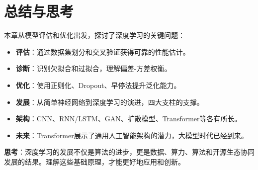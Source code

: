 \section{总结与思考}

本章从模型评估和优化出发，探讨了深度学习的关键问题：
\begin{itemize}
    \item \textbf{评估}：通过数据集划分和交叉验证获得可靠的性能估计。
    \item \textbf{诊断}：识别欠拟合和过拟合，理解偏差-方差权衡。
    \item \textbf{优化}：使用正则化、Dropout、早停法提升泛化能力。
    \item \textbf{发展}：从简单神经网络到深度学习的演进，四大支柱的支撑。
    \item \textbf{架构}：CNN、RNN/LSTM、GAN、扩散模型、Transformer等各有所长。
    \item \textbf{未来}：Transformer展示了通用人工智能架构的潜力，大模型时代已经到来。
\end{itemize}

\textbf{思考}：深度学习的发展不仅是算法的进步，更是数据、算力、算法和开源生态协同发展的结果。理解这些基础原理，才能更好地应用和创新。
